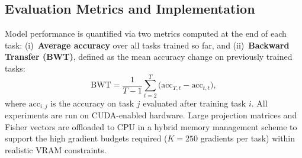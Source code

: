 \subsection{Evaluation Metrics and Implementation}
Model performance is quantified via two metrics computed at the end of each task:
(i)~\textbf{Average accuracy} over all tasks trained so far, and
(ii)~\textbf{Backward Transfer (BWT)}, defined as the mean accuracy change on
previously trained tasks:
\begin{equation}
    \mathrm{BWT} = \frac{1}{T-1}\sum_{t=2}^{T}
    \bigl(\text{acc}_{T,t} - \text{acc}_{t,t}\bigr),
\end{equation}
where $\text{acc}_{i,j}$ is the accuracy on task $j$ evaluated after training
task $i$.  All experiments are run on CUDA-enabled hardware.  Large projection
matrices and Fisher vectors are offloaded to CPU in a hybrid memory management
scheme to support the high gradient budgets required ($K = 250$ gradients per
task) within realistic VRAM constraints.

